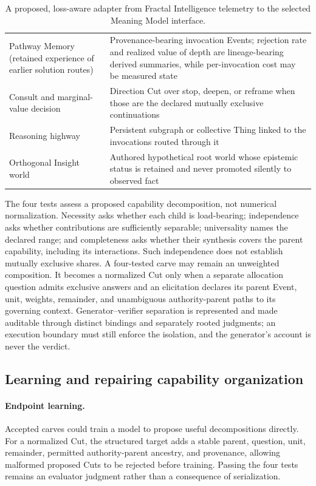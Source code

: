 \documentclass[10pt]{article}
\begin{document}
\begin{table}[H]
\begin{tabularx}{\textwidth}{@{}p{}Y@{}}
Pathway Memory (retained experience of earlier solution routes) & Provenance-bearing invocation Events; rejection rate and realized value of depth are lineage-bearing derived summaries, while per-invocation cost may be measured state \\
Consult and marginal-value decision & Direction Cut over stop, deepen, or reframe when those are the declared mutually exclusive continuations \\
Reasoning highway & Persistent subgraph or collective Thing linked to the invocations routed through it \\
Orthogonal Insight world & Authored hypothetical root world whose epistemic status is retained and never promoted silently to observed fact \\
\bottomrule
\end{tabularx}
\caption{A proposed, loss-aware adapter from Fractal Intelligence telemetry to
the selected Meaning Model interface.}
\label{tab:fractal-meaning-adapter}
\end{table}

The four tests assess a proposed capability decomposition, not numerical
normalization. Necessity asks whether each child is load-bearing; independence
asks whether contributions are sufficiently separable; universality names the
declared range; and completeness asks whether their synthesis covers the
parent capability, including its interactions. Such independence does not
establish mutually exclusive shares. A four-tested carve may remain an
unweighted composition. It becomes a normalized Cut only when a separate
allocation question admits exclusive answers and an elicitation declares
its parent Event, unit, weights, remainder, and unambiguous
authority-parent paths to its governing context. Generator--verifier separation is represented and made
auditable through distinct bindings and separately rooted judgments; an execution boundary must still enforce the isolation,
and the generator's account is never the verdict.

\subsection{Learning and repairing capability organization}
\label{sec:capability-organization}

\paragraph{Endpoint learning.}
Accepted carves could train a model to propose useful decompositions directly.
For a normalized Cut, the structured target adds a stable parent, question, unit, remainder,
permitted authority-parent ancestry, and
provenance, allowing malformed proposed Cuts to be rejected before training.
Passing the four tests remains an evaluator judgment rather than a consequence
of serialization.
\end{document}

